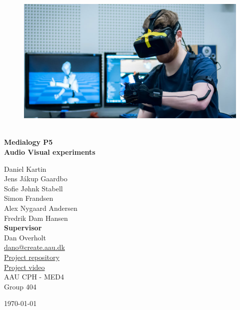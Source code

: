 \begin{titlepage}
			
\addtolength{\voffset}{2cm}

\begin{figure}[H]
\centering
\vspace{2cm}	%
\includegraphics[width=0.99\linewidth]{figure/Frontpage/frontpage.jpg}
\end{figure}

\mbox{}
\vfill
\renewcommand{\familydefault}{\sfdefault} \normalfont %
\HRule\\[0.1cm]
\textbf{{\small Medialogy P5\\ {\Huge Audio Visual experiments}}} \hspace{0.15cm}\\
\HRule\smallskip{}
\begin{multicols}{2}
{\Large Daniel Kartin\\Jens Jákup Gaardbo\\Sofie Jøhnk Stabell\\Simon Frandsen\\Alex Nygaard Andersen\\Fredrik Dam Hansen\columnbreak}\\
\setlength{\parskip}{2.4cm}
{\Large{\textbf{Supervisor}\\Dan Overholt\\\href{mailto:dano@create.aau.dk}{\color{blue}dano@create.aau.dk}}}\medskip\\
\href{https://github.com/totalfreak/medialogyp4code}{\color{blue}Project repository}\\
\href{https://youtu.be/lOfH0zwrcAU}{\color{blue}Project video}\medskip
\\\small AAU CPH - 
MED4 \\
Group 404\\
\end{multicols}
\today
\renewcommand{\familydefault}{\rmdefault} \normalfont %
\end{titlepage}


